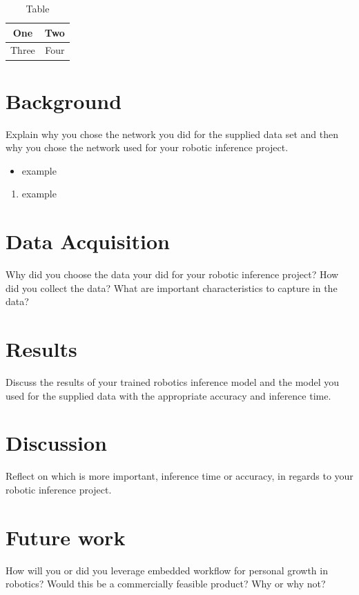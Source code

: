 \documentclass[10pt,journal,compsoc]{IEEEtran}
\begin{document}
\begin{table}[h]
\caption{Table}
\label{table_example}
\begin{center}
\begin{tabular}{|c||c|}
\hline
One & Two\\
\hline
Three & Four\\
\hline
\end{tabular}
\end{center}
\end{table}



   

\section{Background}
Explain why you chose the network you did for the supplied data set and then why you chose the network used for your robotic inference project. \cite{lamport1994latex}


\begin{itemize}
\item example
\end {itemize}



\begin{enumerate}
\item example

\end{enumerate}

\section{Data Acquisition}
Why did you choose the data your did for your robotic inference project? How did you collect the data? What are important characteristics to capture in the data?

\section{Results}
Discuss the results of your trained robotics inference model and the model you used for the supplied data with the appropriate accuracy and inference time.

\section{Discussion}
Reflect on which is more important, inference time or accuracy, in regards to your robotic inference project.

\section{Future work}
How will you or did you leverage embedded workflow for personal growth in robotics? Would this be a commercially feasible product? Why or why not?



\end{document}
